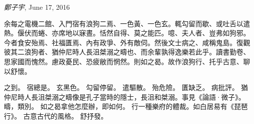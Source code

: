 
\setcounter{cntSubSec}{0}%
\setcounter{cntNote}{0}%

\title{ \Huge{} \large{} }
\author{}
\date{}
\maketitle
\vspace{-1.6cm}%
\hfill{\textit{鄭子宇}, June 17, 2016}



余每之\Cite{}電機二館、入門宿\Cite{}有浪狗二焉、一色黃、一色玄\Cite{}。輒勾留\Cite{}而歇、或吐舌以遣\Cite{}熱。偃伏而蜷、亦席地以寐晝。恬然自得、莫之能匹。噫、夫人者、豈弗如狗邪。今者食安殆\Cite{}焉、社福匱\Cite{}焉、內有政爭、外有敵伺。然後文士病\Cite{}之、咸稱鬼島。復觀彼其二浪狗者、猶仲尼時人長沮桀溺之疇\Cite{}也、而余輩孰得逸樂若此乎。讀書勤卷、思家國而愧然。慮政憂民、恐疲敝而惘然。則如之曷\Cite{}。故作浪狗行\Cite{}、托乎古意\Cite{}、聊以舒\Cite{}懷。

\setcounter{cntNote}{0}%
\Cite{}之\quad 到。
\Cite{}宿\quad 總是。
\Cite{}玄\quad 黑色。
\Cite{}勾留\quad 停留。
\Cite{}遣\quad 驅散。
\Cite{}殆\quad 危險。
\Cite{}匱\quad 缺乏。
\Cite{}病\quad 批評。
\Cite{}猶仲尼時人長沮桀溺之疇\quad 像是孔子當時的隱士，長沮和桀溺。事見《論語·微子》。疇，類別。
\Cite{}如之曷\quad 拿他怎麼辦，即如何。
\Cite{}行\quad 一種樂府的體裁。如白居易有《琵琶行》。
\Cite{}古意\quad 古代的風格。
\Cite{}舒\quad 抒發。







